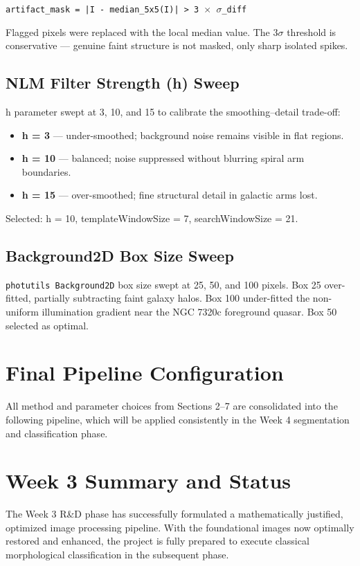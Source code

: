 \documentclass[11pt]{article}
\begin{document}
\texttt{artifact\_mask = |I - median\_5x5(I)| > 3 $\times$ $\sigma$\_diff}

Flagged pixels were replaced with the local median value. The $3\sigma$ threshold is conservative --- genuine faint structure is not masked, only sharp isolated spikes.

\subsection{NLM Filter Strength (h) Sweep}
h parameter swept at 3, 10, and 15 to calibrate the smoothing--detail trade-off:
\begin{itemize}
    \item \textbf{h = 3} --- under-smoothed; background noise remains visible in flat regions.
    \item \textbf{h = 10} --- balanced; noise suppressed without blurring spiral arm boundaries.
    \item \textbf{h = 15} --- over-smoothed; fine structural detail in galactic arms lost.
\end{itemize}
Selected: h = 10, templateWindowSize = 7, searchWindowSize = 21.

\subsection{Background2D Box Size Sweep}
\texttt{photutils Background2D} box size swept at 25, 50, and 100 pixels. Box 25 over-fitted, partially subtracting faint galaxy halos. Box 100 under-fitted the non-uniform illumination gradient near the NGC 7320c foreground quasar. Box 50 selected as optimal.

\section{Final Pipeline Configuration}
All method and parameter choices from Sections 2--7 are consolidated into the following pipeline, which will be applied consistently in the Week 4 segmentation and classification phase.

\section{Week 3 Summary and Status}
The Week 3 R\&D phase has successfully formulated a mathematically justified, optimized image processing pipeline. With the foundational images now optimally restored and enhanced, the project is fully prepared to execute classical morphological classification in the subsequent phase.
\end{document}
